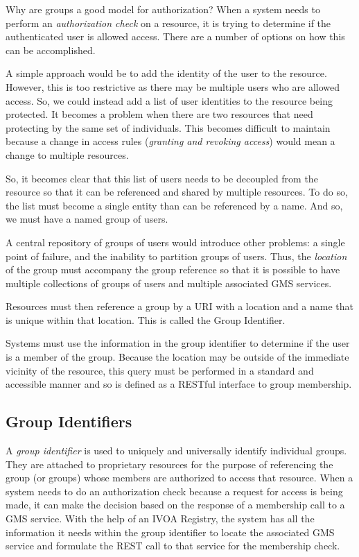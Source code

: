 \documentclass[11pt,a4paper]{ivoa}
\begin{document}
Why are groups a good model for authorization?  When a system needs to perform an \emph{authorization check} on a resource, it is trying to determine if the authenticated user is allowed access.  There are a number of options on how this can be accomplished.

A simple approach would be to add the identity of the user to the resource.  However, this is too restrictive as there may be multiple users who are allowed access.  So, we could instead add a list of user identities to the resource being protected.  It becomes a problem when there are two resources that need protecting by the same set of individuals.  This becomes difficult to maintain because a change in access rules (\emph{granting and revoking access}) would mean a change to multiple resources.

So, it becomes clear that this list of users needs to be decoupled from the resource so that it can be referenced and shared by multiple resources.  To do so, the list must become a single entity than can be referenced by a name.  And so, we must have a named group of users.

A central repository of groups of users would introduce other problems:  a single point of failure, and the inability to partition groups of users.  Thus, the \emph{location} of the group must accompany the group reference so that it is possible to have multiple collections of groups of users and multiple associated GMS services.

Resources must then reference a group by a URI with a location and a name that is unique within that location.  This is called the Group Identifier.

Systems must use the information in the group identifier to determine if the user is a member of the group.  Because the location may be outside of the immediate vicinity of the resource, this query must be performed in a standard and accessible manner and so is defined as a RESTful interface to group membership.

\subsection{Group Identifiers}
\label{subsec:groupids}

A \emph{group identifier} is used to uniquely and universally identify individual groups.  They are attached to proprietary resources for the purpose of referencing the group (or groups) whose members are authorized to access that resource.  When a system needs to do an authorization check because a request for access is being made, it can make the decision based on the response of a membership call to a GMS service.  With the help of an IVOA Registry, the system has all the information it needs within the group identifier to locate the associated GMS service and formulate the REST call to that service for the membership check.
\end{document}
